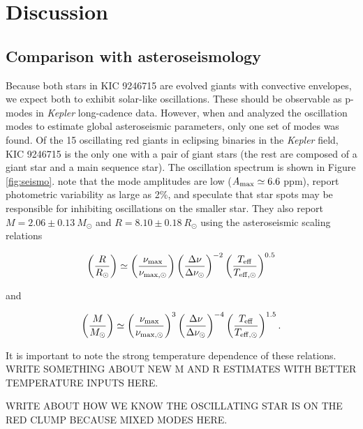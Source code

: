 \section{Discussion}\label{discuss}

\subsection{Comparison with asteroseismology}\label{seismo}

Because both stars in KIC 9246715 are evolved giants with convective envelopes, we expect both to exhibit solar-like oscillations. These should be observable as p-modes in \emph{Kepler} long-cadence data. However, when \citet{gau13} and \citet{gau14} analyzed the oscillation modes to estimate global asteroseismic parameters, only one set of modes was found. Of the 15 oscillating red giants in eclipsing binaries in the \emph{Kepler} field, KIC 9246715 is the only one with a pair of giant stars (the rest are composed of a giant star and a main sequence star). The oscillation spectrum is shown in Figure \ref{fig:seismo}. \citet{gau14} note that the mode amplitudes are low ($A_{\rm{max}} \simeq 6.6$ ppm), report photometric variability as large as 2\%, and speculate that star spots may be responsible for inhibiting oscillations on the smaller star. They also report $M = 2.06 \pm 0.13 \ M_{\odot}$ and $R = 8.10 \pm 0.18 \ R_{\odot}$ using the asteroseismic scaling relations

\begin{equation}
\left( \frac{R}{R_\odot} \right) \simeq \left( \frac{\nu_{\rm{max}}}{\nu_{\rm{max,\odot}}} \right) \left( \frac{\Delta \nu}{\Delta \nu_\odot} \right)^{-2} \left( \frac{T_{\rm{eff}}}{T_{\rm{eff,\odot}}} \right)^{0.5}
\end{equation}\label{radeq}

and

\begin{equation}
\left( \frac{M}{M_\odot} \right) \simeq {\left( \frac{\nu_{\rm{max}}}{\nu_{\rm{max,\odot}}} \right)}^{3} \left( \frac{\Delta \nu}{\Delta \nu_\odot} \right)^{-4} \left( \frac{T_{\rm{eff}}}{T_{\rm{eff,\odot}}} \right)^{1.5}.
\end{equation}\label{masseq}

It is important to note the strong temperature dependence of these relations. WRITE SOMETHING ABOUT NEW M AND R ESTIMATES WITH BETTER TEMPERATURE INPUTS HERE. 

WRITE ABOUT HOW WE KNOW THE OSCILLATING STAR IS ON THE RED CLUMP BECAUSE MIXED MODES HERE.

